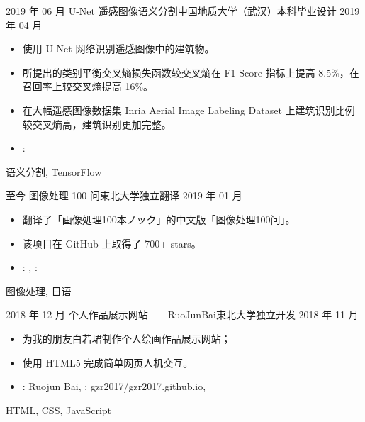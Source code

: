%
%


\begin{experiences}
  \experience
  {2019 年 06 月}   {U-Net 遥感图像语义分割}{中国地质大学（武汉）}{本科毕业设计}
  {2019 年 04 月} {
    \begin{itemize}
      \item 使用 U-Net 网络识别遥感图像中的建筑物。
      \item 所提出的类别平衡交叉熵损失函数较交叉熵在 F1-Score 指标上提高 8.5\%，在召回率上较交叉熵提高 16\%。
      \item 在大幅遥感图像数据集 Inria Aerial Image Labeling Dataset 上建筑识别比例较交叉熵高，建筑识别更加完整。
      \item \faGithub:
    \end{itemize}
  }
  {语义分割, TensorFlow}
  \emptySeparator

  \experience
  {至今} {图像处理 100 问}{東北大学}{独立翻译}
  {2019 年 01 月}    {
    \begin{itemize}
      \item  翻译了「画像処理100本ノック」的中文版「图像处理100问」。
      \item 该项目在 GitHub 上取得了 700+ stars。
      \item \faGithub:
            , \faGithub: 
    \end{itemize}
  }
  {图像处理, 日语}
  \emptySeparator

  \experience
  {2018 年 12 月} {个人作品展示网站——RuoJunBai}{東北大学}{独立开发}
  {2018 年 11 月}    {
    \begin{itemize}
      \item 为我的朋友白若珺制作个人绘画作品展示网站；
      \item 使用 HTML5 完成简单网页人机交互。
      \item \faLink:  {Ruojun Bai}, \faGithub:  {gzr2017/gzr2017.github.io},
    \end{itemize}
  }
  {HTML, CSS, JavaScript}
  \emptySeparator


\end{experiences}
